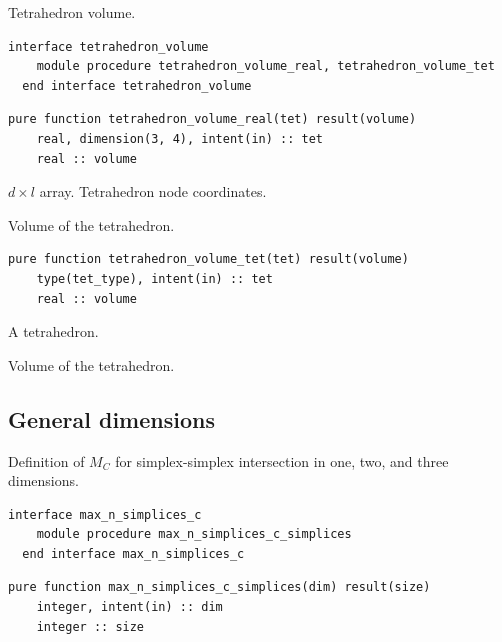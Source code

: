 \documentclass{article}
\begin{document}
\noindent Tetrahedron volume.

\begin{lstlisting}[language=FORTRAN]
  interface tetrahedron_volume
    module procedure tetrahedron_volume_real, tetrahedron_volume_tet
  end interface tetrahedron_volume
\end{lstlisting}

\begin{lstlisting}[language=FORTRAN]
  pure function tetrahedron_volume_real(tet) result(volume)
    real, dimension(3, 4), intent(in) :: tet
    real :: volume
\end{lstlisting}

\begin{description}[font=\ttfamily\bfseries,leftmargin=2.2\parindent,labelindent=1.7\parindent,noitemsep]
  \item[tet] $d \times l$ array. Tetrahedron node coordinates.
  \item[volume] Volume of the tetrahedron.
\end{description}

\begin{lstlisting}[language=FORTRAN]
  pure function tetrahedron_volume_tet(tet) result(volume)
    type(tet_type), intent(in) :: tet
    real :: volume
\end{lstlisting}

\begin{description}[font=\ttfamily\bfseries,leftmargin=2.2\parindent,labelindent=1.7\parindent,noitemsep]
  \item[tet] A tetrahedron.
  \item[volume] Volume of the tetrahedron.
\end{description}

\subsection{General dimensions}\label{sect:nD_intersection}

Definition of $M_C$ for simplex-simplex intersection in one, two, and three
dimensions.

\begin{lstlisting}[language=FORTRAN]
  interface max_n_simplices_c
    module procedure max_n_simplices_c_simplices
  end interface max_n_simplices_c
\end{lstlisting}

\begin{lstlisting}[language=FORTRAN]
  pure function max_n_simplices_c_simplices(dim) result(size)
    integer, intent(in) :: dim
    integer :: size
\end{lstlisting}
\end{document}
